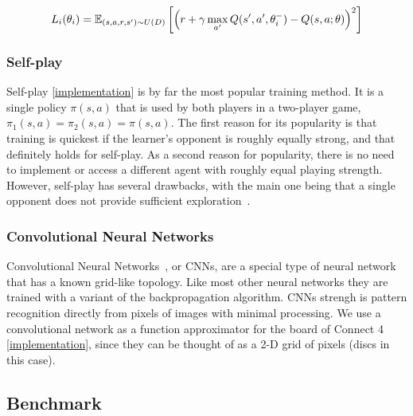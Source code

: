 \documentclass{article}
\newcommand{\GithubURL}[1]{[\href{https://github.com/davidrobles/mlnd-capstone-code/blob/master/#1}{implementation}]}
\begin{document}
\begin{equation}
L_i(\theta_i) = \mathbb{E}_{(s, a, r, s') \sim U(D)} \\
                \left[\left(r + \gamma \max_{a'} Q(s',a', \theta^-_i) - Q(s,a;\theta)\right)^2\right]
\end{equation}

\subsubsection{Self-play}

Self-play \GithubURL{capstone/rl/learners/qlearning_approx.py\#L24} is by far the most popular
training method. It is a single policy $\pi(s,a)$ that is used by both players in a two-player game,
$\pi_1(s,a) = \pi_2(s,a) = \pi(s,a)$. The first reason for its popularity is that training is
quickest if the learner's opponent is roughly equally strong, and that definitely holds for
self-play. As a second reason for popularity, there is no need to implement or access a different
agent with roughly equal playing strength. However, self-play has several drawbacks, with the main
one being that a single opponent does not provide sufficient exploration~\citep{Szita2011RLGames}.

\subsubsection{Convolutional Neural Networks}

Convolutional Neural Networks~\citep{LeCun1989}, or CNNs, are a special type of neural network that
has a known grid-like topology. Like most other neural networks they are trained with a variant of
the backpropagation algorithm. CNNs strengh is pattern recognition directly from pixels of images
with minimal processing. We use a convolutional network as a function approximator for the board of
Connect 4 \GithubURL{capstone/rl/value_functions/c4deepnetwork.py\#L42}, since they can be thought
of as a 2-D grid of pixels (discs in this case).

\subsection{Benchmark}
\label{sec:benchmark}
\end{document}
